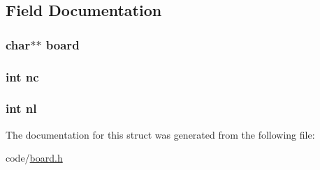 \subsection{Field Documentation}
\hypertarget{structstruct__board_a55cb9414a970dc2e3e8bb4a4d151b79f}{
\subsubsection[{board}]{\setlength{\rightskip}{0pt plus 5cm}char$\ast$$\ast$ board}}\label{structstruct__board_a55cb9414a970dc2e3e8bb4a4d151b79f}
\hypertarget{structstruct__board_a2e6c8f821f88e1dab510dc11a7824721}{
\subsubsection[{nc}]{\setlength{\rightskip}{0pt plus 5cm}int nc}}\label{structstruct__board_a2e6c8f821f88e1dab510dc11a7824721}
\hypertarget{structstruct__board_a2a7a369dd7dd433c403f33cba2600a42}{
\subsubsection[{nl}]{\setlength{\rightskip}{0pt plus 5cm}int nl}}\label{structstruct__board_a2a7a369dd7dd433c403f33cba2600a42}


The documentation for this struct was generated from the following file\+:\begin{DoxyCompactItemize}
\item 
code/\hyperlink{board_8h}{board.\+h}\end{DoxyCompactItemize}
